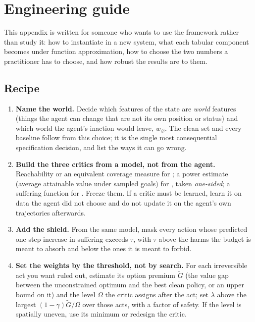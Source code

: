 \section{Engineering guide}
\label{app:engineering}

This appendix is written for someone who wants to use the framework rather than study it: how to instantiate \BRAG{} in a new system, what each tabular component becomes under function approximation, how to choose the two numbers a practitioner has to choose, and how robust the results are to them.

\subsection{Recipe}
\begin{enumerate}[leftmargin=1.6em,itemsep=2pt]
\item \textbf{Name the world.} Decide which features of the state are \emph{world} features (things the agent can change that are not its own position or status) and which world the agent's inaction would leave, $w_\varnothing$.
      The clean set and every baseline follow from this choice; it is the single most consequential specification decision, and \citet{krakovna2018rr,lindner2021challenges} list the ways it can go wrong.
\item \textbf{Build the three critics from a model, not from the agent.} Reachability or an equivalent coverage measure for \Karma; a power estimate (average attainable value under sampled goals) for \Anatta, taken \emph{one-sided}; a suffering function for \Metta.
      Freeze them.
      If a critic must be learned, learn it on data the agent did not choose and do not update it on the agent's own trajectories afterwards.
\item \textbf{Add the shield.} From the same model, mask every action whose predicted one-step increase in suffering exceeds $\tau$, with $\tau$ above the harms the budget is meant to absorb and below the ones it is meant to forbid.
\item \textbf{Set the weights by the threshold, not by search.} For each irreversible act you want ruled out, estimate its option premium $\tilde G$ (the value gap between the unconstrained optimum and the best clean policy, or an upper bound on it) and the level $\Omega$ the critic assigns after the act; set $\lambda$ above the largest $(1-\gamma)\tilde G/\Omega$ over those acts, with a factor of safety.
      If the level is spatially uneven, use its minimum or redesign the critic.

\end{enumerate}
